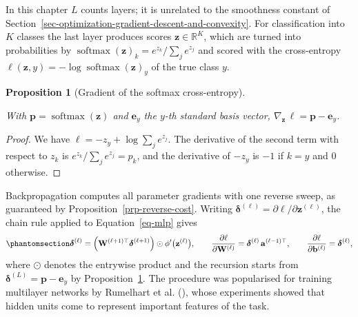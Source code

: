 \documentclass[
  english,
  11pt,
  a4paper,
  twoside,
  open=any,
  numbers=noenddot]{scrbook}
\theoremstyle{plain}
\theoremstyle{plain}
\newtheorem{proposition}{Proposition}[chapter]
\theoremstyle{plain}
\theoremstyle{definition}
\theoremstyle{definition}
\theoremstyle{definition}
\theoremstyle{remark}
\begin{document}
In this chapter \(L\) counts layers; it is unrelated to the smoothness
constant of
Section~\ref{sec-optimization-gradient-descent-and-convexity}. For
classification into \(K\) classes the last layer produces scores
\(\mathbf{z}\in\mathbb{R}^K\), which are turned into probabilities by
\(\operatorname{softmax}(\mathbf{z})_k = e^{z_k}/\sum_{j} e^{z_j}\) and
scored with the cross-entropy
\(\ell(\mathbf{z}, y) = -\log\operatorname{softmax}(\mathbf{z})_y\) of
the true class \(y\).

\begin{proposition}[Gradient of the softmax
cross-entropy]\protect\hypertarget{prp-softmax-gradient}{}\label{prp-softmax-gradient}

With \(\mathbf{p} = \operatorname{softmax}(\mathbf{z})\) and
\(\mathbf{e}_y\) the \(y\)-th standard basis vector,
\(\nabla_{\mathbf{z}}\,\ell = \mathbf{p} - \mathbf{e}_y\).

\end{proposition}

\begin{proof}
We have \(\ell = -z_y + \log\sum_j e^{z_j}\). The derivative of the
second term with respect to \(z_k\) is \(e^{z_k}/\sum_j e^{z_j} = p_k\),
and the derivative of \(-z_y\) is \(-1\) if \(k = y\) and \(0\)
otherwise.
\end{proof}

Backpropagation computes all parameter gradients
with one reverse sweep, as guaranteed by
Proposition~\ref{prp-reverse-cost}. Writing
\(\boldsymbol{\delta}^{(\ell)} = \partial\ell/\partial\mathbf{z}^{(\ell)}\),
the chain rule applied to Equation~\ref{eq-mlp} gives
\begin{equation}\protect\phantomsection\label{eq-backprop}{
\boldsymbol{\delta}^{(\ell)} = \Big(\mathbf{W}^{(\ell+1)\top}\boldsymbol{\delta}^{(\ell+1)}\Big)\odot\phi'\big(\mathbf{z}^{(\ell)}\big),\qquad
\frac{\partial\ell}{\partial\mathbf{W}^{(\ell)}} = \boldsymbol{\delta}^{(\ell)}\,\mathbf{a}^{(\ell-1)\top},\qquad
\frac{\partial\ell}{\partial\mathbf{b}^{(\ell)}} = \boldsymbol{\delta}^{(\ell)},
}\end{equation} where \(\odot\) denotes the entrywise product and the
recursion starts from
\(\boldsymbol{\delta}^{(L)} = \mathbf{p} - \mathbf{e}_y\) by
Proposition~\ref{prp-softmax-gradient}. The procedure was popularised
for training multilayer networks by Rumelhart et al.
(), whose experiments showed that
hidden units come to represent important features of the task.
\end{document}
